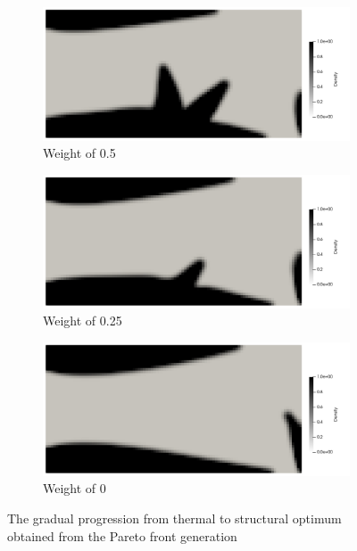\begin{figure}[ht]
    \centering
    \begin{subfigure}[b]{0.45\linewidth}
        \includegraphics[width=\linewidth]{figures/chapter_5/MF_1to1.png}
        \caption{Weight of 0.5}
    \end{subfigure}
    \hfill
    \begin{subfigure}[b]{0.45\linewidth}
        \includegraphics[width=\linewidth]{figures/chapter_5/MF_1to3.png}
        \caption{Weight of 0.25}
    \end{subfigure}

    \centering
    \begin{subfigure}[b]{0.45\linewidth}
        \includegraphics[width=\linewidth]{figures/chapter_5/MF_0to1.png}
        \caption{Weight of 0}
    \end{subfigure}
    \caption{The gradual progression from thermal to structural optimum obtained from the Pareto front generation}
    \label{fig:multi-functional_optimum_progression}
\end{figure}


